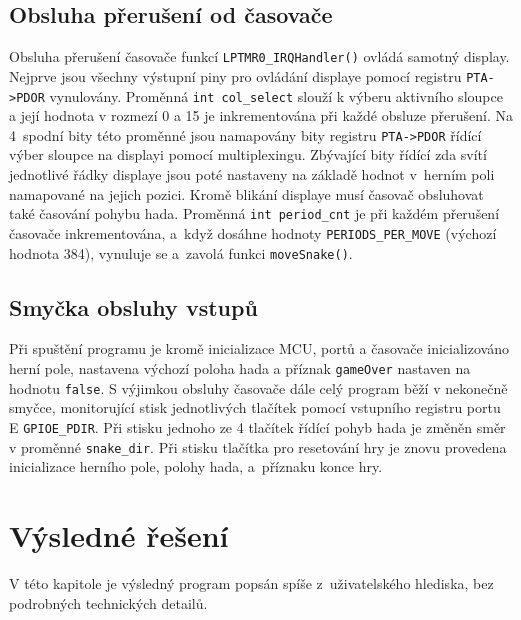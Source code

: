 \documentclass[a4paper, 11pt]{article}
\begin{document}
\subsection{Obsluha přerušení od časovače}
Obsluha přerušení časovače funkcí \verb|LPTMR0_IRQHandler()| ovládá samotný display.
Nejprve jsou všechny výstupní piny pro ovládání displaye pomocí registru \verb|PTA->PDOR| vynulovány.
Proměnná \verb|int col_select| slouží k výberu aktivního sloupce a její hodnota v rozmezí 0 a 15
je inkrementována při každé obsluze přerušení. Na 4~spodní bity této proměnné jsou namapovány
bity registru \verb|PTA->PDOR| řídící výber sloupce na displayi pomocí multiplexingu. Zbývající bity řídící
zda svítí jednotlivé řádky displaye jsou poté nastaveny na základě hodnot v~herním poli
namapované na jejich pozici.
Kromě blikání displaye musí časovač obsluhovat také časování pohybu hada.
Proměnná \verb|int period_cnt| je při každém přerušení časovače inkrementována, a~když dosáhne hodnoty
\verb|PERIODS_PER_MOVE| (výchozí hodnota 384), vynuluje se a~zavolá funkci \verb|moveSnake()|.

\subsection{Smyčka obsluhy vstupů}
Při spuštění programu je kromě inicializace MCU, portů a časovače inicializováno herní pole,
nastavena výchozí poloha hada a příznak \verb|gameOver| nastaven na hodnotu \verb|false|.
S výjimkou obsluhy časovače dále celý program běží v nekonečně smyčce,
monitorující stisk jednotlivých tlačítek pomocí vstupního registru portu E \verb|GPIOE_PDIR|.
Při stisku jednoho ze 4 tlačítek řídící pohyb hada je změněn směr v proměnné \verb|snake_dir|.
Při stisku tlačítka pro resetování hry je znovu provedena inicializace herního pole, polohy hada,
a~příznaku konce hry.



\section{Výsledné řešení}
V této kapitole je výsledný program popsán spíše z~uživatelského hlediska, bez podrobných technických detailů.
\end{document}

